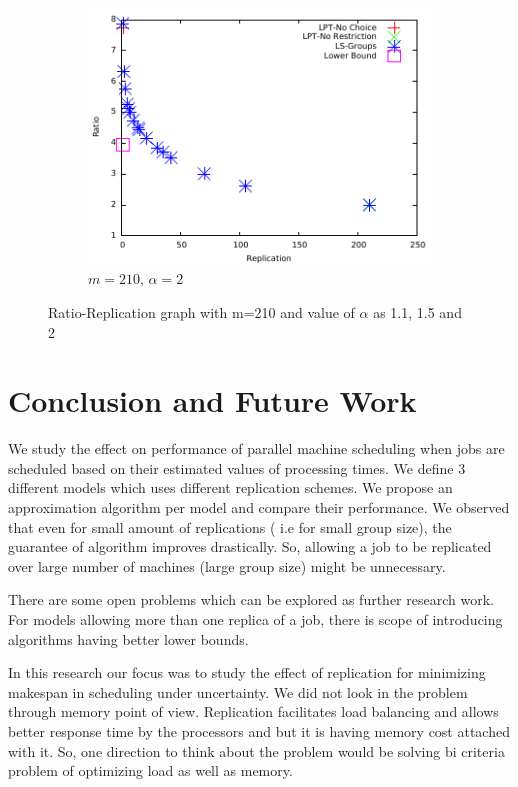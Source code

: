 \documentclass[10pt, conference, compsocconf]{IEEEtran}
\begin{document}
\begin {figure}
\begin{subfigure}[b]{0.5\textwidth}
     \includegraphics[width=\textwidth]{alpha_2.pdf}
     \caption{$m=210$, $\alpha=2$}
      \label{fig:3}
\end {subfigure} %


\caption{Ratio-Replication graph with m=210 and value of $\alpha$ as 1.1, 1.5 and 2}
\label{fig:Graph}
\end {figure}

\section{Conclusion and Future Work}\label{sec8}

We study the effect on performance of parallel machine scheduling when jobs are scheduled based on their estimated values of processing times.  We define 3 different models which uses different replication schemes.  We propose an  approximation algorithm per model and compare their performance. We observed that even for small amount of replications ( i.e for small group size), the guarantee of algorithm improves drastically. So, allowing a job to be replicated over large number of machines (large group size) might be unnecessary. 

There are some open problems which can be explored as further research work. For models allowing more than one replica of a job, there is scope of introducing algorithms having better lower bounds.

 In this research our focus was to study the effect of replication for minimizing makespan in scheduling under uncertainty. We did not look in the problem through memory point of view. Replication facilitates load balancing and allows better response time by the processors and  but it is having memory cost attached with it. So, one direction to think about the problem would be solving bi criteria problem of optimizing load as well as memory. 
 
\end{document}
